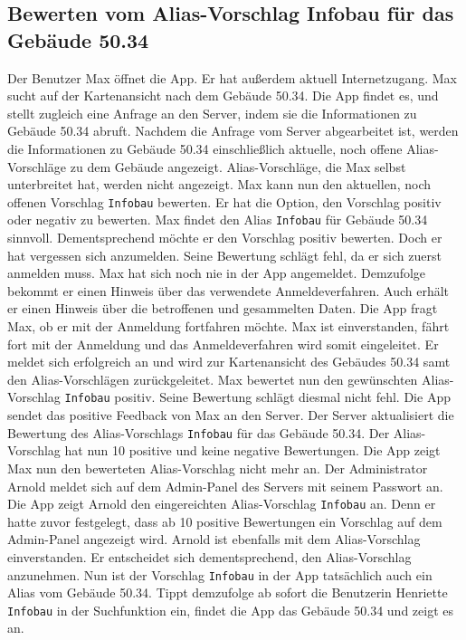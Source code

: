 \subsection{Bewerten vom Alias-Vorschlag Infobau für das Gebäude 50.34}

Der Benutzer Max öffnet die App.
Er hat außerdem aktuell Internetzugang.
Max sucht auf der Kartenansicht nach dem Gebäude 50.34.
Die App findet es, und stellt zugleich eine Anfrage an den Server, indem sie die Informationen zu Gebäude 50.34 abruft.
Nachdem die Anfrage vom Server abgearbeitet ist, werden die Informationen zu Gebäude 50.34 einschließlich aktuelle, noch offene Alias-Vorschläge zu dem Gebäude angezeigt.
Alias-Vorschläge, die Max selbst unterbreitet hat, werden nicht angezeigt.
Max kann nun den aktuellen, noch offenen Vorschlag \texttt{Infobau} bewerten.
Er hat die Option, den Vorschlag positiv oder negativ zu bewerten.
Max findet den Alias \texttt{Infobau} für Gebäude 50.34 sinnvoll.
Dementsprechend möchte er den Vorschlag positiv bewerten.
Doch er hat vergessen sich anzumelden.
Seine Bewertung schlägt fehl, da er sich zuerst anmelden muss.
Max hat sich noch nie in der App angemeldet.
Demzufolge bekommt er einen Hinweis über das verwendete Anmeldeverfahren.
Auch erhält er einen Hinweis über die betroffenen und gesammelten Daten.
Die App fragt Max, ob er mit der Anmeldung fortfahren möchte.
Max ist einverstanden, fährt fort mit der Anmeldung und das Anmeldeverfahren wird somit eingeleitet.
Er meldet sich erfolgreich an und wird zur Kartenansicht des Gebäudes 50.34 samt den Alias-Vorschlägen zurückgeleitet.
Max bewertet nun den gewünschten Alias-Vorschlag \texttt{Infobau} positiv.
Seine Bewertung schlägt diesmal nicht fehl.
Die App sendet das positive Feedback von Max an den Server.
Der Server aktualisiert die Bewertung des Alias-Vorschlags \texttt{Infobau} für das Gebäude 50.34.
Der Alias-Vorschlag hat nun 10 positive und keine negative Bewertungen.
Die App zeigt Max nun den bewerteten Alias-Vorschlag nicht mehr an.
Der Administrator Arnold meldet sich auf dem Admin-Panel des Servers mit seinem Passwort an.
Die App zeigt Arnold den eingereichten Alias-Vorschlag \texttt{Infobau} an.
Denn er hatte zuvor festgelegt, dass ab 10 positive Bewertungen ein Vorschlag auf dem Admin-Panel angezeigt wird.
Arnold ist ebenfalls mit dem Alias-Vorschlag einverstanden.
Er entscheidet sich dementsprechend, den Alias-Vorschlag anzunehmen.
Nun ist der Vorschlag \texttt{Infobau} in der App tatsächlich auch ein Alias vom Gebäude 50.34.
Tippt demzufolge ab sofort die Benutzerin Henriette \texttt{Infobau} in der Suchfunktion ein, findet die App das Gebäude 50.34 und zeigt es an.
